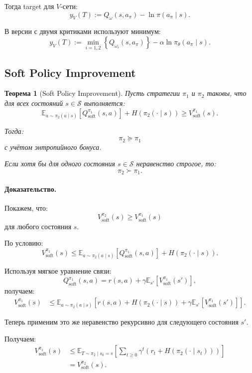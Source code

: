 \documentclass[12pt,a4paper]{article}
\newtheorem{theorem}{Теорема}
\begin{document}
Тогда target для $V$-сети:
\[
y_V(T)
:=
Q_\omega(s,a_\pi)
-
\ln\pi(a_\pi\mid s).
\]

В версии с двумя критиками используют минимум:
\[
y_V(T)
:=
\min_{i=1,2}
\left\{
Q_{\omega_i}(s,a_\pi)
\right\}
-
\alpha\ln\pi_\theta(a_\pi\mid s).
\]

\subsection{Soft Policy Improvement}

\begin{theorem}[Soft Policy Improvement]
Пусть стратегии $\pi_1$ и $\pi_2$ таковы, что для всех состояний $s\in\mathcal S$ выполняется:
\[
\mathbb E_{a\sim\pi_2(a\mid s)}
\left[
Q^{\pi_1}_{\mathrm{soft}}(s,a)
\right]
+
H(\pi_2(\cdot\mid s))
\ge
V^{\pi_1}_{\mathrm{soft}}(s).
\]

Тогда:
\[
\pi_2\succeq\pi_1
\]
с учётом энтропийного бонуса.

Если хотя бы для одного состояния $s\in\mathcal S$ неравенство строгое, то:
\[
\pi_2\succ\pi_1.
\]
\end{theorem}

\paragraph{Доказательство.}

Покажем, что:
\[
V^{\pi_2}_{\mathrm{soft}}(s)
\ge
V^{\pi_1}_{\mathrm{soft}}(s)
\]
для любого состояния $s$.

По условию:
\[
V^{\pi_1}_{\mathrm{soft}}(s)
\le
\mathbb E_{a\sim\pi_2(a\mid s)}
\left[
Q^{\pi_1}_{\mathrm{soft}}(s,a)
\right]
+
H(\pi_2(\cdot\mid s)).
\]

Используя мягкое уравнение связи:
\[
Q^{\pi_1}_{\mathrm{soft}}(s,a)
=
r(s,a)
+
\gamma
\mathbb E_{s'}
\left[
V^{\pi_1}_{\mathrm{soft}}(s')
\right],
\]
получаем:
\[
\begin{aligned}
V^{\pi_1}_{\mathrm{soft}}(s)
&\le
\mathbb E_{a\sim\pi_2(a\mid s)}
\left[
r(s,a)
+
H(\pi_2(\cdot\mid s))
+
\gamma
\mathbb E_{s'}
\left[
V^{\pi_1}_{\mathrm{soft}}(s')
\right]
\right].
\end{aligned}
\]

Теперь применим это же неравенство рекурсивно для следующего состояния $s'$.

Получаем:
\[
\begin{aligned}
V^{\pi_1}_{\mathrm{soft}}(s)
&\le
\mathbb E_{T\sim\pi_2\mid s_0=s}
\left[
\sum_{t\ge 0}
\gamma^t
\left(
r_t
+
H(\pi_2(\cdot\mid s_t))
\right)
\right]
\\
&=
V^{\pi_2}_{\mathrm{soft}}(s).
\end{aligned}
\]
\end{document}
